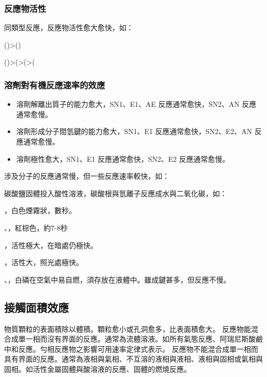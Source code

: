 \documentclass[a4paper,12pt]{article}
\begin{document}
\subsubsection{反應物活性}
同類型反應，反應物活性愈大愈快，如：
\bit
\item ()>()
\item ()>(>(>(
\eit
\subsubsection{溶劑對有機反應速率的效應}
\begin{itemize}
\item 溶劑解離出質子的能力愈大，SN1、E1、AE 反應通常愈快，SN2、AN 反應通常愈慢。
\item 溶劑形成分子間氫鍵的能力愈大，SN1、E1 反應通常愈快，SN2、E2、AN 反應通常愈慢。
\item 溶劑極性愈大，SN1、E1 反應通常愈快，SN2、E2 反應通常愈慢。
\end{itemize}
涉及分子的反應通常慢，但一些反應速率較快，如：
\bit
\item 碳酸鹽固體投入酸性溶液，碳酸根與氫離子反應成水與二氧化碳，如：
\item {}，白色煙霧狀，數秒。
\item {}、，紅棕色，約7-8秒
\item {}，活性極大，在暗處仍極快。
\item {}，活性大，照光處極快。
\item {}、，白磷在空氣中易自燃，須存放在液體中。雖成鍵甚多，但反應不慢。
\eit
\subsection{接觸面積效應}
物質顆粒的表面積除以體積。顆粒愈小或孔洞愈多，比表面積愈大。
反應物能混合成單一相而沒有界面的反應。通常為流體溶液。如所有氣態反應、阿瑞尼斯酸鹼中和反應。勻相反應物之影響可用速率定律式表示。
反應物不能混合成單一相而具有界面的反應。通常為液相與氣相、不互溶的液相與液相、液相與固相或氣相與固相。如活性金屬固體與酸溶液的反應、固體的燃燒反應。
\end{document}

